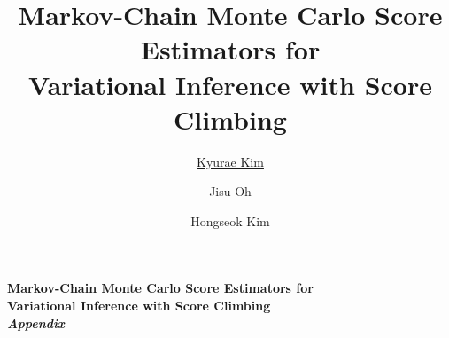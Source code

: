 \documentclass{uai2022} %
\title{Markov-Chain Monte Carlo Score Estimators for \\ Variational Inference with Score Climbing}
\author[1]{\href{mailto:<msca8h@sogang.ac.kr>}{Kyurae Kim}{}}
\author[1]{Jisu Oh}
\author[1]{Hongseok Kim}
\affil[1]{%
    Sogang University\\
    Seoul, South Korea, Republic of
}
\begin{document}
\maketitle

\begin{abstract}
  
\end{abstract}










\begin{acknowledgements} %

\end{acknowledgements}

\vspace{-0.1in}


\newpage
\onecolumn
\appendix

\begin{center}
  \LARGE\bf
  Markov-Chain Monte Carlo Score Estimators for \\
  Variational Inference with Score Climbing \\
  \textit{Appendix}
\end{center}

\end{document}

